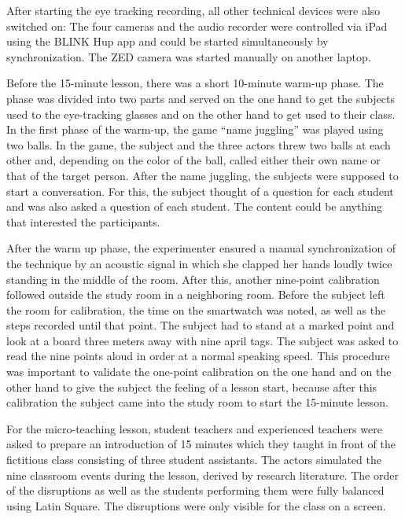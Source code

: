 \documentclass[
  man,floatsintext]{apa6}
\begin{document}
After starting the eye tracking recording, all other technical devices were also switched on: The four cameras and the audio recorder were controlled via iPad using the BLINK Hup app and could be started simultaneously by synchronization. The ZED camera was started manually on another laptop.

Before the 15-minute lesson, there was a short 10-minute warm-up phase. The phase was divided into two parts and served on the one hand to get the subjects used to the eye-tracking glasses and on the other hand to get used to their class. In the first phase of the warm-up, the game ``name juggling'' was played using two balls. In the game, the subject and the three actors threw two balls at each other and, depending on the color of the ball, called either their own name or that of the target person. After the name juggling, the subjects were supposed to start a conversation. For this, the subject thought of a question for each student and was also asked a question of each student. The content could be anything that interested the participants.

After the warm up phase, the experimenter ensured a manual synchronization of the technique by an acoustic signal in which she clapped her hands loudly twice standing in the middle of the room. After this, another nine-point calibration followed outside the study room in a neighboring room. Before the subject left the room for calibration, the time on the smartwatch was noted, as well as the steps recorded until that point. The subject had to stand at a marked point and look at a board three meters away with nine april tags. The subject was asked to read the nine points aloud in order at a normal speaking speed. This procedure was important to validate the one-point calibration on the one hand and on the other hand to give the subject the feeling of a lesson start, because after this calibration the subject came into the study room to start the 15-minute lesson.

For the micro-teaching lesson, student teachers and experienced teachers were asked to prepare an introduction of 15 minutes which they taught in front of the fictitious class consisting of three student assistants. The actors simulated the nine classroom events during the lesson, derived by research literature. The order of the disruptions as well as the students performing them were fully balanced using Latin Square. The disruptions were only visible for the class on a screen.
\end{document}
